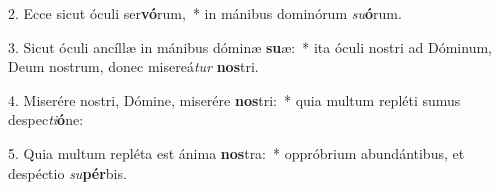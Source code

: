 2. Ecce sicut óculi ser\textbf{vó}rum,~*  in mánibus dominórum \textit{su}\textbf{ó}rum.\

3. Sicut óculi ancíllæ in mánibus dóminæ \textbf{su}æ:~*  ita óculi nostri ad Dóminum, Deum nostrum, donec misereá\textit{tur} \textbf{nos}tri.\

4. Miserére nostri, Dómine, miserére \textbf{nos}tri:~*  quia multum repléti sumus despec\textit{ti}\textbf{ó}ne:\

5. Quia multum repléta est ánima \textbf{nos}tra:~*  oppróbrium abundántibus, et despéctio \textit{su}\textbf{pér}bis.\

